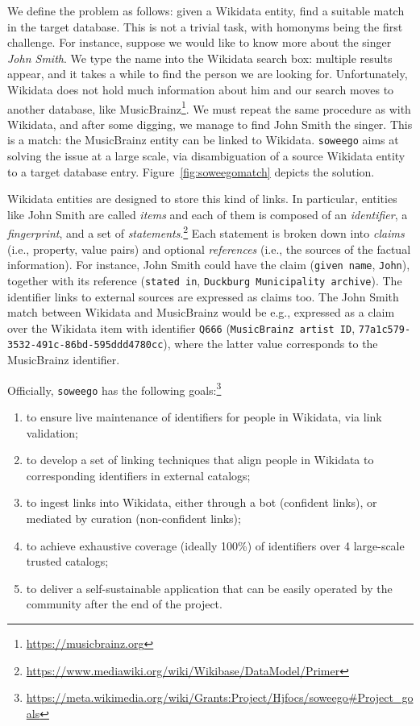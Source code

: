 We define the problem as follows: given a Wikidata entity, find a suitable match in the target database.
This is not a trivial task, with homonyms being the first challenge.
For instance, suppose we would like to know more about the singer \textit{John Smith}.
We type the name into the Wikidata search box: multiple results appear, and it takes a while to find the person we are looking for.
Unfortunately, Wikidata does not hold much information about him and our search moves to another database, like MusicBrainz\footnote{\url{https://musicbrainz.org}}.
We must repeat the same procedure as with Wikidata, and after some digging, we manage to find John Smith the singer. This is a match: the MusicBrainz entity can be linked to Wikidata.
\texttt{soweego} aims at solving the issue at a large scale, via disambiguation of a source Wikidata entity to a target database entry. Figure~\ref{fig:soweegomatch} depicts the solution.

Wikidata entities are designed to store this kind of links. In particular, entities like John Smith are called \textit{items} and each of them is composed of an \textit{identifier}, a \textit{fingerprint}, and a set of \textit{statements}.\footnote{\url{https://www.mediawiki.org/wiki/Wikibase/DataModel/Primer}}
Each statement is broken down into \textit{claims} (i.e., property, value pairs) and optional \textit{references} (i.e., the sources of the factual information).
For instance, John Smith could have the claim (\texttt{given name}, \texttt{John}), together with its reference (\texttt{stated in}, \texttt{Duckburg Municipality archive}).
The identifier links to external sources are expressed as claims too.
The John Smith match between Wikidata and MusicBrainz would be e.g., expressed as a claim over the Wikidata item with identifier \texttt{Q666} (\texttt{MusicBrainz artist ID}, \texttt{77a1c579-3532-491c-86bd-595ddd4780cc}), where the latter value corresponds to the MusicBrainz identifier.

Officially, \texttt{soweego} has the following goals:\footnote{\url{https://meta.wikimedia.org/wiki/Grants:Project/Hjfocs/soweego\#Project_goals}}
\begin{enumerate}
    \item to ensure live maintenance of identifiers for people in Wikidata, via link validation;
    \item to develop a set of linking techniques that align people in Wikidata to corresponding identifiers in external catalogs;
    \item to ingest links into Wikidata, either through a bot (confident links), or mediated by curation (non-confident links);
    \item to achieve exhaustive coverage (ideally 100\%) of identifiers over 4 large-scale trusted catalogs;
    \item to deliver a self-sustainable application that can be easily operated by the community after the end of the project.
\end{enumerate}

